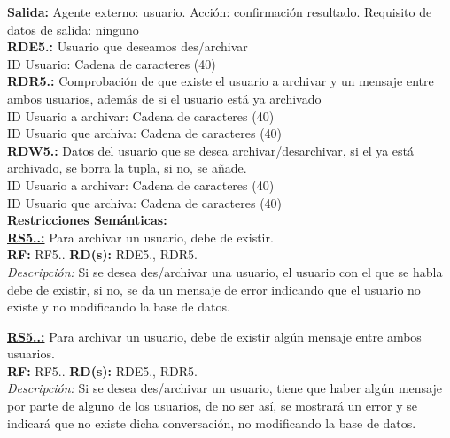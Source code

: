 \textbf{\textcolor{rojo}{Salida:}} Agente externo: usuario. Acción: confirmación resultado. 
Requisito de datos de salida: ninguno \\[12pt]

\textcolor{azul}{\textbf{RDE5.\theRDE:}} Usuario que deseamos des/archivar   \\
\hspace*{1cm} ID Usuario: Cadena de caracteres (40) \\[12pt]

\textcolor{azul}{\textbf{RDR5.\theRDR:}} Comprobación de que existe el usuario a archivar y un mensaje entre ambos usuarios, además de si el usuario está ya archivado\\
\hspace*{1cm} ID Usuario a archivar: Cadena de caracteres (40) \\
\hspace*{1cm} ID Usuario que archiva: Cadena de caracteres (40) \\[12pt]

\textcolor{azul}{\textbf{RDW5.\theRDW:}} Datos del usuario que se desea archivar/desarchivar, si el ya está archivado, se borra la tupla, si no, se añade. \\
\hspace*{1cm} ID Usuario a archivar: Cadena de caracteres (40) \\
\hspace*{1cm} ID Usuario que archiva: Cadena de caracteres (40) \\[12pt]

\setcounter{RS}{1}
\textbf{\textcolor{verde}{Restricciones Semánticas:}} \\[6pt]
\textbf{\textcolor{verde}{\underline{RS5.\theRF.\theRS:}}} Para archivar un usuario, debe de existir. \\
\textbf{RF:} RF5.\theRF. \textbf{RD(s):} RDE5.\theRDE, RDR5.\theRDR \\
\hspace*{1cm} \textit{Descripción:} Si se desea des/archivar una usuario, el usuario con el que se habla debe de existir, si no, se da un mensaje de error indicando que el usuario no existe y no modificando la base de datos. \\ [6pt]

\textbf{\textcolor{verde}{\underline{RS5.\theRF.\theRS:}}} Para archivar un usuario, debe de existir algún mensaje entre ambos usuarios. \\
\textbf{RF:} RF5.\theRF. \textbf{RD(s):} RDE5.\theRDE, RDR5.\theRDR \\
\hspace*{1cm} \textit{Descripción:} Si se desea des/archivar un usuario, tiene que haber algún mensaje por parte de alguno de los usuarios, de no ser así, se mostrará un error y se indicará que no existe dicha conversación, no modificando la base de datos. \\ [6pt]


